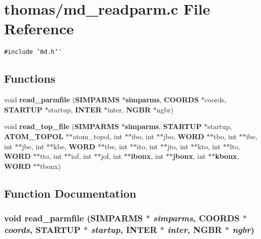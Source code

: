 \section{thomas/md\_\-readparm.c File Reference}
\label{thomas_2md__readparm_8c}
{\tt \#include \char`\"{}md.h\char`\"{}}\par
\subsection*{Functions}
\begin{CompactItemize}
\item 
void {\bf read\_\-parmfile} ({\bf SIMPARMS} $\ast${\bf simparms}, {\bf COORDS} $\ast$coords, {\bf STARTUP} $\ast$startup, {\bf INTER} $\ast$inter, {\bf NGBR} $\ast$ngbr)
\item 
void {\bf read\_\-top\_\-file} ({\bf SIMPARMS} $\ast${\bf simparms}, {\bf STARTUP} $\ast$startup, {\bf ATOM\_\-TOPOL} $\ast$$\ast$atom\_\-topol, int $\ast$$\ast$ibo, int $\ast$$\ast$jbo, {\bf WORD} $\ast$$\ast$tbo, int $\ast$$\ast$ibe, int $\ast$$\ast$jbe, int $\ast$$\ast$kbe, {\bf WORD} $\ast$$\ast$tbe, int $\ast$$\ast$ito, int $\ast$$\ast$jto, int $\ast$$\ast$kto, int $\ast$$\ast$lto, {\bf WORD} $\ast$$\ast$tto, int $\ast$$\ast$iof, int $\ast$$\ast$jof, int $\ast$$\ast${\bf ibonx}, int $\ast$$\ast${\bf jbonx}, int $\ast$$\ast${\bf kbonx}, {\bf WORD} $\ast$$\ast$tbonx)
\end{CompactItemize}


\subsection{Function Documentation}
\subsubsection{\setlength{\rightskip}{0pt plus 5cm}void read\_\-parmfile ({\bf SIMPARMS} $\ast$ {\em simparms}, {\bf COORDS} $\ast$ {\em coords}, {\bf STARTUP} $\ast$ {\em startup}, {\bf INTER} $\ast$ {\em inter}, {\bf NGBR} $\ast$ {\em ngbr})}\label{thomas_2md__readparm_8c_098e8de7f740d4e3126b1b9b1df1b446}


